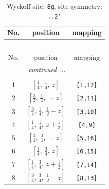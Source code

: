 \documentclass[fleqn,8pt]{jsarticle}
\begin{document}
\begin{longtable}{ccc}
\caption{Wyckoff site: {\tt 8g}, site symmetry: {\tt ..2'}}
 \\
 \hline \hline
No. & position & mapping \\ \hline \endfirsthead

\multicolumn{2}{l}{\tablename\ \thetable{}} \\
 \hline \hline
No. & position & mapping \\ \hline \endhead

 \hline \hline
\multicolumn{2}{r}{\footnotesize\it continued ...} \\ \endfoot

 \hline \hline
\multicolumn{2}{r}{} \\ \endlastfoot

1 & $\left[ \frac{1}{4},\, \frac{1}{4},\, z \right]$ & {\tt [1,12]} \\ \hline
2 & $\left[ \frac{3}{4},\, \frac{1}{4},\, - z \right]$ & {\tt [2,11]} \\ \hline
3 & $\left[ \frac{3}{4},\, \frac{1}{4},\, \frac{1}{2} - z \right]$ & {\tt [3,10]} \\ \hline
4 & $\left[ \frac{1}{4},\, \frac{1}{4},\, z + \frac{1}{2} \right]$ & {\tt [4,9]} \\ \hline
5 & $\left[ \frac{3}{4},\, \frac{3}{4},\, - z \right]$ & {\tt [5,16]} \\ \hline
6 & $\left[ \frac{1}{4},\, \frac{3}{4},\, z \right]$ & {\tt [6,15]} \\ \hline
7 & $\left[ \frac{1}{4},\, \frac{3}{4},\, z + \frac{1}{2} \right]$ & {\tt [7,14]} \\ \hline
8 & $\left[ \frac{3}{4},\, \frac{3}{4},\, \frac{1}{2} - z \right]$ & {\tt [8,13]} \\
\end{longtable}
\renewcommand{\arraystretch}{1.2}
\end{document}
